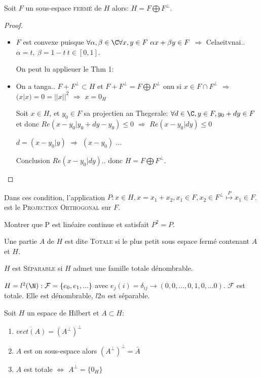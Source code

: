 \begin{theorem}[corollaire]
	Soit $F$ un sous-espace \textsc{fermé} de $H$ alors: $H=F\bigoplus F^\perp$.
\end{theorem}
\begin{proof}
	\begin{itemize}
		\item $F$ est convexe puisque $\forall \alpha,\beta\in\C \forall x, y\in F\ \alpha x+\beta y\in F$ $\Rightarrow$ Celaeitvnai.. $\alpha = t,\ \beta=1-t\ t\in[0,1]$.
	
	On peut lu applieuer le Thm 1:
		\item On a tanga.. $F+F^\perp \subset H$ et $F+F^\perp = F\bigoplus F^\perp$ onu si $x\in F\cap F^\perp$ $\Rightarrow$ $(x|x)=0=||x||^2$ $\Rightarrow$ $x=0_H$
		
		Soit $x\in H$, et $y_0\in F$ sa projectien an Thegerale: $\forall d\in \C, y\in F, y_0+dy\in F$ et donc $Re(x-y_0| y_0+dy-y_0)\leq 0$ $\Rightarrow$ $Re(x-y_0|dy)\leq 0$
		
		$d=(x-y_0|y)$ $\Rightarrow$ $(x-y_0)$
		...
		
	Conclusion $Re(x-y_0|dy)$.. donc $H=F\bigoplus F^\perp$.
	\end{itemize}
\end{proof}

\begin{definition}
	Dans ces condition, l'application $P:x\in H, x=x_1+x_2, x_1\in F, x_2\in F^\perp \overset{P}{\mapsto} x_1\in F$. est le \textsc{Projection Orthogonal} sur $F$.
\end{definition}

\begin{examplebox}
	Montrer que P est linéaire continue et satisfait $P^2=P$.
\end{examplebox}

\begin{definition}
	Une partie $A$ de $H$ est dite \textsc{Totale} si le plus petit sous espace fermé contenant $A$ et $H$.

	$H$ est \textsc{Séparable} si $H$ admet une famille totale dénombrable.
\end{definition}

\begin{example}
	$H=l^2(\N): \mathcal{F}=\{e_0, e_1, ...\}$ avec $e_j(i)=\delta_{ij}\to (0,0,..., 0,1,0,... 0)$. $\mathcal{F}$ est totale. Elle est dénombrable, $l2n$ est séparable.
\end{example}

\begin{theorem}
	Soit $H$ un espace de Hilbert et $A\subset H$:
	\begin{enumerate}
		\item $\overline{vect(A)}=(A^\perp)^\perp$
		\item $A$ est on sous-espace alors $(A^\perp)^\perp=\bar A$
		\item $A$ est totale $\Leftrightarrow$ $A^\perp=\{0_H\}$
	\end{enumerate}
\end{theorem}

